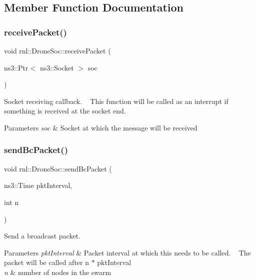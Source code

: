 \subsection{Member Function Documentation}
\mbox{\label{structrnl_1_1DroneSoc_a4945013e829ed896e2ca82699e62e711}} 
\subsubsection{\texorpdfstring{receive\+Packet()}{receivePacket()}}
{\footnotesize\ttfamily void rnl\+::\+Drone\+Soc\+::receive\+Packet (\begin{DoxyParamCaption}\item[{ns3\+::\+Ptr$<$ ns3\+::\+Socket $>$}]{soc }\end{DoxyParamCaption})}



Socket receiving callback. ~\newline
This function will be called as an interrupt if something is received at the socket end. 


\begin{DoxyParams}{Parameters}
{\em soc} & Socket at which the message will be received \\
\hline
\end{DoxyParams}
\mbox{\label{structrnl_1_1DroneSoc_ab6c91121d046bf9632c1353c30ffde73}} 
\subsubsection{\texorpdfstring{send\+Bc\+Packet()}{sendBcPacket()}}
{\footnotesize\ttfamily void rnl\+::\+Drone\+Soc\+::send\+Bc\+Packet (\begin{DoxyParamCaption}\item[{ns3\+::\+Time}]{pkt\+Interval,  }\item[{int}]{n }\end{DoxyParamCaption})}



Send a broadcast packet. 


\begin{DoxyParams}{Parameters}
{\em pkt\+Interval} & Packet interval at which this needs to be called. ~\newline
The packet will be called after n $\ast$ pkt\+Interval\\
\hline
{\em n} & number of nodes in the swarm \\
\hline
\end{DoxyParams}
\mbox{\label{structrnl_1_1DroneSoc_a21ec1cbe2adaefffc5f4472a59b07d6f}} 
